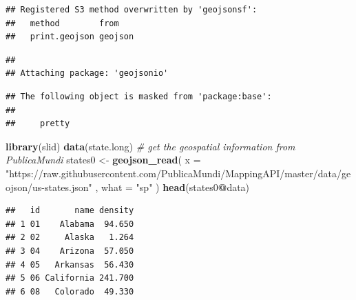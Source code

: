 \documentclass[]{book}
\newenvironment{Shaded}{\begin{snugshade}}{\end{snugshade}}
\newcommand{\KeywordTok}[1]{\textcolor[rgb]{0.13,0.29,0.53}{\textbf{#1}}}
\newcommand{\DataTypeTok}[1]{\textcolor[rgb]{0.13,0.29,0.53}{#1}}
\newcommand{\StringTok}[1]{\textcolor[rgb]{0.31,0.60,0.02}{#1}}
\newcommand{\CommentTok}[1]{\textcolor[rgb]{0.56,0.35,0.01}{\textit{#1}}}
\newcommand{\OperatorTok}[1]{\textcolor[rgb]{0.81,0.36,0.00}{\textbf{#1}}}
\newcommand{\NormalTok}[1]{#1}
\begin{document}
\begin{verbatim}
## Registered S3 method overwritten by 'geojsonsf':
##   method        from   
##   print.geojson geojson
\end{verbatim}

\begin{verbatim}
## 
## Attaching package: 'geojsonio'
\end{verbatim}

\begin{verbatim}
## The following object is masked from 'package:base':
## 
##     pretty
\end{verbatim}

\begin{Shaded}
\begin{Highlighting}[]
\KeywordTok{library}\NormalTok{(slid)}
\KeywordTok{data}\NormalTok{(state.long)}
\CommentTok{# get the geospatial information from PublicaMundi}
\NormalTok{states0 <-}\StringTok{ }\KeywordTok{geojson_read}\NormalTok{(}
  \DataTypeTok{x =} \StringTok{"https://raw.githubusercontent.com/PublicaMundi/MappingAPI/master/data/geojson/us-states.json"}
\NormalTok{  , }\DataTypeTok{what =} \StringTok{"sp"}
\NormalTok{)}
\KeywordTok{head}\NormalTok{(states0}\OperatorTok{@}\NormalTok{data)}
\end{Highlighting}
\end{Shaded}

\begin{verbatim}
##   id       name density
## 1 01    Alabama  94.650
## 2 02     Alaska   1.264
## 3 04    Arizona  57.050
## 4 05   Arkansas  56.430
## 5 06 California 241.700
## 6 08   Colorado  49.330
\end{verbatim}
\end{document}
